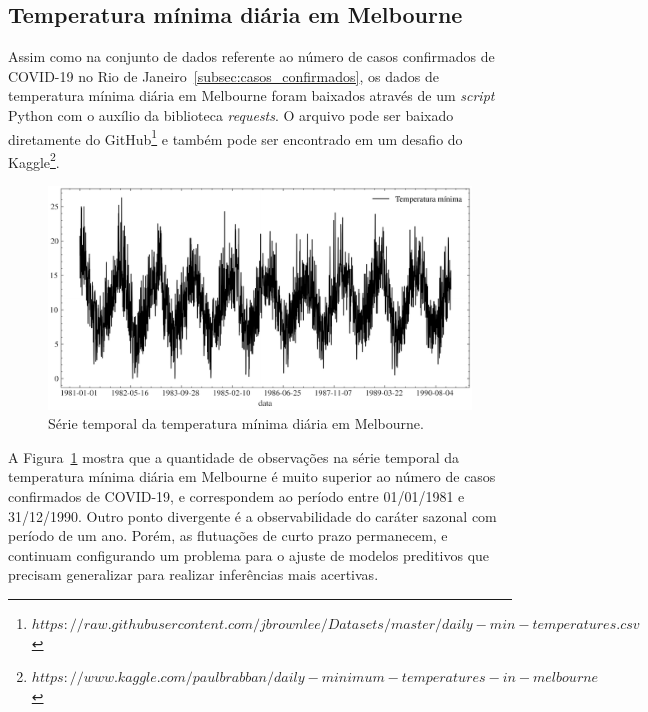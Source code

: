 \FloatBarrier

\subsection{Temperatura mínima diária em Melbourne}
Assim como na conjunto de dados referente ao número de casos confirmados de COVID-19 no Rio de Janeiro~\ref{subsec:casos_confirmados}, os dados de temperatura mínima diária em Melbourne foram baixados através de um \textit{script} Python com o auxílio da biblioteca \textit{requests}. O arquivo pode ser baixado diretamente do GitHub\footnote{$https://raw.githubusercontent.com/jbrownlee/Datasets/master/daily-min-temperatures.csv$} e também pode ser encontrado em um desafio do Kaggle\footnote{$https://www.kaggle.com/paulbrabban/daily-minimum-temperatures-in-melbourne$}.

\begin{figure}[!htp]
    \centering
    \includegraphics[width=5.0in]{img/temperatura_minima_diaria.pdf}
    \caption{Série temporal da temperatura mínima diária em Melbourne.}\label{fig:temperatura_minima_diaria}
\end{figure}

A Figura~\ref{fig:temperatura_minima_diaria} mostra que a quantidade de observações na série temporal da temperatura mínima diária em Melbourne é muito superior ao número de casos confirmados de COVID-19, e correspondem ao período entre 01/01/1981 e 31/12/1990. Outro ponto divergente é a observabilidade do caráter sazonal com período de um ano. Porém, as flutuações de curto prazo permanecem, e continuam configurando um problema para o ajuste de modelos preditivos que precisam generalizar para realizar inferências mais acertivas.

